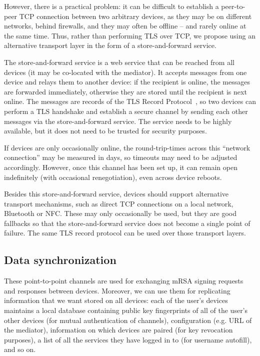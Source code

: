 However, there is a practical problem: it can be difficult to establish a peer-to-peer TCP
connection between two arbitrary devices, as they may be on different networks, behind firewalls,
and they may often be offline -- and rarely online at the same time. Thus, rather than performing
TLS over TCP, we propose using an alternative transport layer in the form of a store-and-forward
service.

The store-and-forward service is a web service that can be reached from all devices (it may be
co-located with the mediator). It accepts messages from one device and relays them to another
device: if the recipient is online, the messages are forwarded immediately, otherwise they are
stored until the recipient is next online. The messages are records of the TLS Record
Protocol~\cite{TLS}, so two devices can perform a TLS handshake and establish a secure channel by
sending each other messages via the store-and-forward service. The service needs to be highly
available, but it does not need to be trusted for security purposes.

If devices are only occasionally online, the round-trip-times across this ``network connection'' may
be measured in days, so timeouts may need to be adjusted accordingly. However, once this channel has
been set up, it can remain open indefinitely (with occasional renegotiation), even across device
reboots.

Besides this store-and-forward service, devices should support alternative transport mechanisms,
such as direct TCP connections on a local network, Bluetooth or NFC. These may only occasionally be
used, but they are good fallbacks so that the store-and-forward service does not become a single
point of failure. The same TLS record protocol can be used over those transport layers.

\subsection{Data synchronization}\label{sec:devicesync}

These point-to-point channels are used for exchanging mRSA signing requests and responses between
devices. Moreover, we can use them for replicating information that we want stored on all devices:
each of the user's devices maintains a local database containing public key fingerprints of all of
the user's other devices (for mutual authentication of channels), configuration (e.g. URL of the
mediator), information on which devices are paired (for key revocation purposes), a list of all the
services they have logged in to (for username autofill), and so on.

